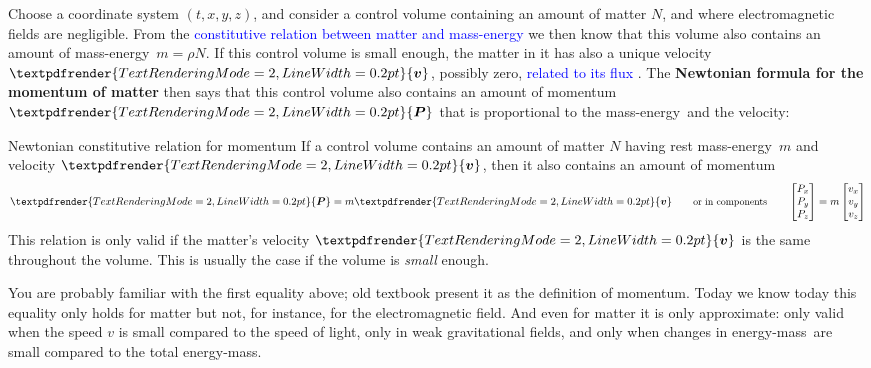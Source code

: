 \documentclass[a4paper,12pt,%
onecolumn,oneside,%
british%
]{memoir}
\renewcommand*{\bm}[1]{\textpdfrender{TextRenderingMode=2,LineWidth=0.2pt}{\boldsymbol{#1}}}
\renewcommand*{\P}{\mathrm{P}}%
\renewcommand*{\|}[1][]{\nonscript\:#1\vert\nonscript\:\mathopen{}}
\newcommand*{\sect}{\S}%
\renewcommand*{\autoref}[3][\sect\,\ref]{\textcolor{blue}{#3}
\raisebox{0.6ex}{\color{blue}\miniscule%
\faIcon{angle-right}%
\;#1{#2}\;p.\,\pageref{#2}}}
\newcommand*{\energym}{energy-mass}
\newcommand*{\masse}{mass-energy}
\newcommand*{\yv}{\bm{v}}
\newcommand*{\yN}{N}
\newcommand*{\yrho}{\rho}
\newcommand*{\ym}{m}%
\newcommand*{\yP}{\bm{P}}
\begin{document}
Choose a coordinate system $(t,x,y,z)$, and consider a control volume containing an amount of matter $\yN$, and where electromagnetic fields are negligible. From the \autoref{sec:const_matter_mass}{constitutive relation between matter and \masse} we then know that this volume also contains an amount of \masse\ $\ym=\yrho\yN$. If this control volume is small enough, the matter in it has also a unique velocity $\yv$, possibly zero, \autoref{sec:fluxes_velocities}{related to its flux}. The \textbf{Newtonian formula for the momentum of matter} then says that this control volume also contains an amount of momentum $\yP$ that is proportional to the \masse\ and the velocity:
%
\begin{definition}{Newtonian constitutive relation for momentum}
If a control volume contains an amount of matter $\yN$ having rest \masse\ $\ym$ and velocity $\yv$, then it also contains an amount of momentum
\begin{equation}
  \label{eq:matter_momentum_Newton}
  \yP = \ym \yv
  \qquad\text{\small or in components}\qquad
  \begin{bmatrix}
    P_{x}\\P_{y}\\P_{z}
  \end{bmatrix}
  = \ym
  \begin{bmatrix}
    v_{x}\\v_{y}\\v_{z}
  \end{bmatrix}
\end{equation}
This relation is only valid if the matter's velocity $\yv$ is the same throughout the volume. This is usually the case if the volume is \emph{small} enough.
\end{definition}

You are probably familiar with the first equality above; old textbook present it as the definition of momentum. Today we know today  this equality only holds for matter but not, for instance, for the electromagnetic field. And even for matter it is only approximate: only valid when the speed $v$ is small compared to the speed of light, only in weak gravitational fields, and only when changes in \energym\ are small compared to the total \energym.
\end{document}
